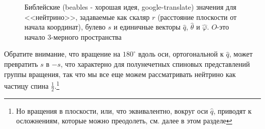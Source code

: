 \documentclass[main.tex]{subfiles}
\begin{document}
\begin{figure}[ht]
\begin{center}
\caption{
\label{i15.2} Библейские (beables - хорошая идея, google-translate) значения для <<нейтрино>>, задаваемые как скаляр $r$ (расстояние плоскости от начала координат), булево $s$ и единичные векторы $\hat q$, $\hat \theta$ и $\hat \varphi$. $O$-это начало 3-мерного пространства}
\end {center}
\end {figure}

Обратите внимание, что вращение на $180^\circ$ вдоль оси, ортогональной к $\hat q$, может превратить $s$ в $-s$, что характерно для полунечетных спиновых представлений группы вращения, так что мы все еще можем рассматривать нейтрино как частицу спина $\frac 1 2$.\footnote{Но вращения в плоскости, или, что эквивалентно, вокруг оси $\hat q$, приводят к осложнениям, которые можно преодолеть, см. далее в этом разделе}
\end{document}
